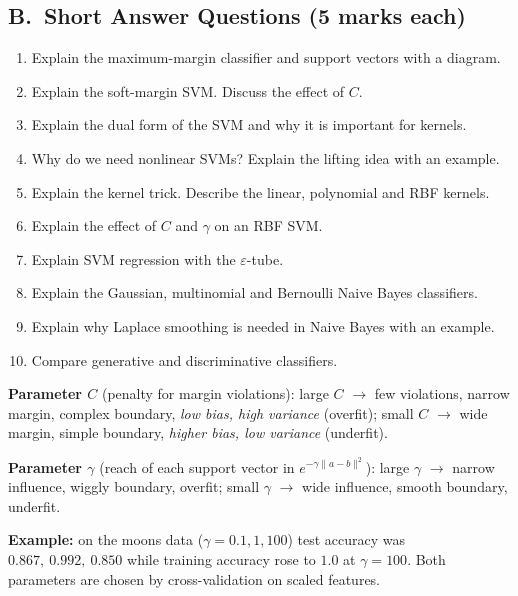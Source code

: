 \subsection*{B.\ Short Answer Questions (5 marks each)}
\begin{enumerate}
  \item Explain the maximum-margin classifier and support vectors with a diagram. 
  \item Explain the soft-margin SVM. Discuss the effect of $C$. 
  \item Explain the dual form of the SVM and why it is important for kernels. 
  \item Why do we need nonlinear SVMs? Explain the lifting idea with an example. 
  \item Explain the kernel trick. Describe the linear, polynomial and RBF kernels. 
  \item Explain the effect of $C$ and $\gamma$ on an RBF SVM. 
  \item Explain SVM regression with the $\varepsilon$-tube. 
  \item Explain the Gaussian, multinomial and Bernoulli Naive Bayes classifiers. 
  \item Explain why Laplace smoothing is needed in Naive Bayes with an example. 
  \item Compare generative and discriminative classifiers. 
\end{enumerate}

\begin{modelans}
\textbf{Parameter $C$} (penalty for margin violations): large $C$ $\to$ few violations, narrow margin, complex boundary, \emph{low bias, high variance} (overfit); small $C$ $\to$ wide margin, simple boundary, \emph{higher bias, low variance} (underfit).\par
\textbf{Parameter $\gamma$} (reach of each support vector in $e^{-\gamma\|a-b\|^2}$): large $\gamma$ $\to$ narrow influence, wiggly boundary, overfit; small $\gamma$ $\to$ wide influence, smooth boundary, underfit.\par
\textbf{Example:} on the moons data ($\gamma=0.1,1,100$) test accuracy was $0.867,\ 0.992,\ 0.850$ while training accuracy rose to $1.0$ at $\gamma=100$. Both parameters are chosen by cross-validation on scaled features.
\end{modelans}

